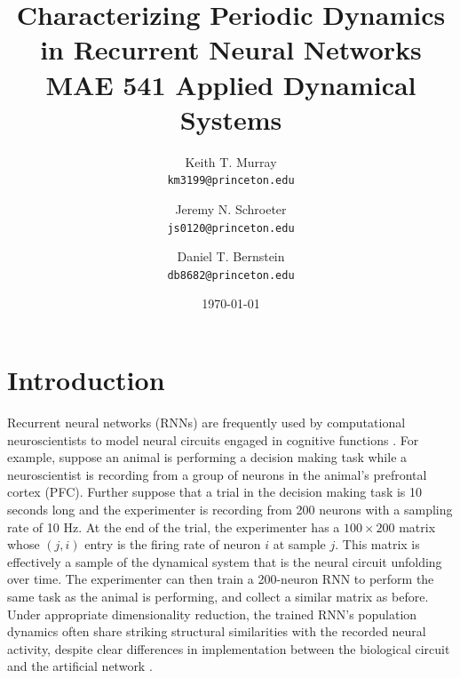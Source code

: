 \documentclass[11pt, letterpaper]{article}
\title{
    \textbf{Characterizing Periodic Dynamics in Recurrent Neural Networks} \\[0.4em]
    \large MAE 541 Applied Dynamical Systems
}
\author{
    Keith T. Murray \\ \small\texttt{km3199@princeton.edu}
    \and
    Jeremy N. Schroeter \\ \small\texttt{js0120@princeton.edu}
    \and
    Daniel T. Bernstein \\ \small\texttt{db8682@princeton.edu}
}
\date{\today}
\begin{document}
\maketitle

\section{Introduction}

Recurrent neural networks (RNNs) are frequently used by computational neuroscientists to model neural circuits engaged in cognitive functions \citep{sussillo2014neural,barak2017recurrent}. For example, suppose an animal is performing a decision making task while a neuroscientist is recording from a group of neurons in the animal's prefrontal cortex (PFC). Further suppose that a trial in the decision making task is 10 seconds long and the experimenter is recording from 200 neurons with a sampling rate of 10 Hz. At the end of the trial, the experimenter has a $100 \times 200$ matrix whose $(j, i)$ entry is the firing rate of neuron $i$ at sample $j$. This matrix is effectively a sample of the dynamical system that is the neural circuit unfolding over time. The experimenter can then train a 200-neuron RNN to perform the same task as the animal is performing, and collect a similar matrix as before. Under appropriate dimensionality reduction, the trained RNN's population dynamics often share striking structural similarities with the recorded neural activity, despite clear differences in implementation between the biological circuit and the artificial network \citep{mante2013context,sussillo2015neural,chaisangmongkon2017computing,sohn2019bayesian}.
\end{document}
